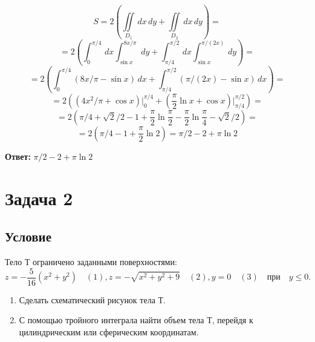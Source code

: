 \documentclass[12pt]{article}
\begin{document}
\begin{enumerate}[wide, labelwidth=!, labelindent=0pt]
\begin{center}
		\end{center}		
		$$S= 2(\iint \limits_{D_1} \,d x\,d y + \iint \limits_{D_2} \,d x\,d y)=$$
		$$= 2(\int_{0}^{\pi/4} \,dx \int_{\sin x}^{8x / \pi} \,dy + \int_{\pi/4}^{\pi/2} \,dx \int_{\sin x}^{\pi / (2x)} \,dy)=$$
		$$=2(\int_{0}^{\pi/4}(8x/\pi  - \sin x) \,dx + \int_{\pi/4}^{\pi/2}(\pi/(2x) - \sin x ) \,dx)=$$
		$$=2((4x^{2}/\pi + \cos x)\Big|_0^{\pi/4} + (\frac{\pi}{2}\ln x+ \cos x)\Big|_{\pi/4}^{\pi/2})=$$
		$$ =2(\pi/4 + \sqrt{2}/2 - 1 +\frac{\pi}{2}\ln{\frac{\pi}{2}} - \frac{\pi}{2}\ln{\frac{\pi}{4}} -\sqrt{2}/2)=$$
		$$= 2(\pi/4-1+\frac{\pi}{2}\ln{2})=\pi/2 - 2 +\pi\ln2$$
					
	\end{enumerate}		
	\hspace{290pt}\textbf{Ответ:} $\pi/2 - 2 +\pi\ln2$	
	
	\newpage
	\section*{Задача 2}	
	\subsection*{Условие}
	
	Тело $Т$ ограничено заданными поверхностями: $$z=-\frac{5}{16}(x^2+y^2)\quad(1), z=-\sqrt{x^2+y^2 + 9}\quad(2), y=0\quad(3) \quad \textrm{при} \quad y \leq 0.$$
	
	\begin{enumerate}
		\item Сделать схематический рисунок тела $Т$.
		\item С помощью тройного интеграла найти объем тела $Т$, перейдя к цилиндрическим или сферическим координатам. 
	\end{enumerate}
	
\end{document}
